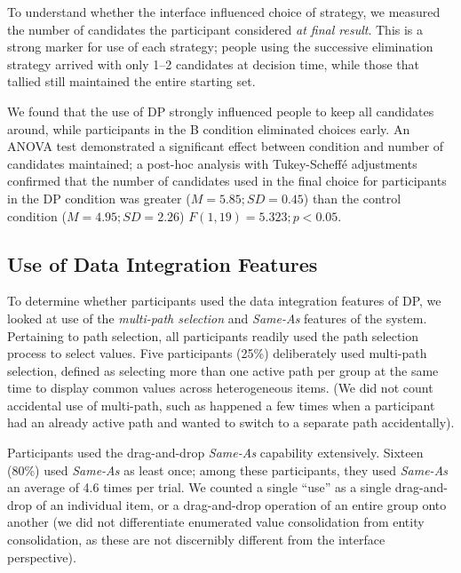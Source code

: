 \documentclass{sigchi}
\begin{document}
To understand whether the interface influenced choice of strategy, we measured the number of candidates the participant considered \emph{at final result}.  This is a strong marker for use of each strategy; people using the successive elimination strategy arrived with only 1--2 candidates at decision time, while those that tallied still maintained the entire starting set.

We found that the use of DP strongly influenced people to keep all candidates around, while participants in the B condition eliminated choices early.  An ANOVA test demonstrated a significant effect between condition and number of candidates maintained; a post-hoc analysis with Tukey-Scheff\'{e} adjustments confirmed that the number of candidates used in the final choice for participants in the DP condition was greater ($M=5.85;SD=0.45$) than the control condition ($M=4.95; SD=2.26$) $F(1,19)=5.323; p<0.05$.

\subsection{Use of Data Integration Features}

To determine whether participants used the data integration features of DP, we looked at use of the \emph{multi-path selection} and \emph{Same-As} features of the system.   Pertaining to path selection, all participants readily used the path selection process to select values.   Five participants (25\%) deliberately used multi-path selection, defined as selecting more than one active path per group at the same time to display common values across heterogeneous items. (We did not count accidental use of multi-path, such as happened a few times when a participant had an already active path and wanted to switch to a separate path accidentally).

Participants used the drag-and-drop \emph{Same-As} capability extensively. Sixteen (80\%) used \emph{Same-As} as least once; among these participants, they used \emph{Same-As} an average of 4.6 times per trial. We counted a single ``use'' as a single drag-and-drop of an individual item, or a drag-and-drop operation of an entire group onto another (we did not differentiate enumerated value consolidation from entity consolidation, as these are not discernibly different from the interface perspective).

\end{document}

